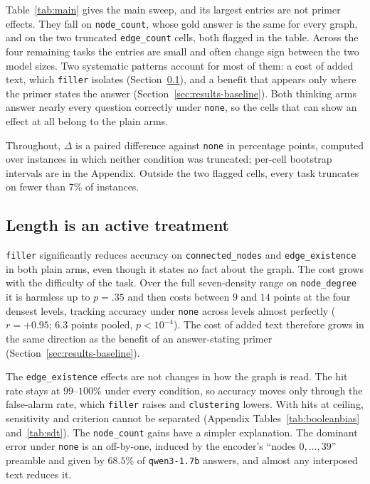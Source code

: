 \documentclass[11pt]{article}
\begin{document}


Table~\ref{tab:main} gives the main sweep, and its largest entries are not
primer effects. They fall on \texttt{node\_count}, whose gold answer is the
same for every graph, and on the two truncated \texttt{edge\_count} cells,
both flagged in the table. Across the four remaining tasks the entries are
small and often change sign between the two model sizes. Two systematic
patterns account for most of them: a cost of added text, which
\texttt{filler} isolates (Section~\ref{sec:results-length}), and a benefit
that appears only where the primer states the answer
(Section~\ref{sec:results-baseline}). Both thinking arms answer nearly
every question correctly under \texttt{none}, so the cells that can show an
effect at all belong to the plain arms.

Throughout, $\Delta$ is a paired difference against \texttt{none} in
percentage points, computed over instances in which neither condition was
truncated; per-cell bootstrap intervals are in the Appendix. Outside the
two flagged cells, every task truncates on fewer than $7\%$ of instances.

\subsection{Length is an active treatment}
\label{sec:results-length}

\texttt{filler} significantly reduces accuracy on
\texttt{connected\_nodes} and \texttt{edge\_existence} in both plain arms,
even though it states no fact about the graph. The cost grows with the
difficulty of the task. Over the full seven-density range on
\texttt{node\_degree} it is harmless up to $p{=}.35$ and then costs between
$9$ and $14$ points at the four densest levels, tracking accuracy under
\texttt{none} across levels almost perfectly ($r{=}{+}0.95$; $6.3$ points
pooled, $p{<}10^{-4}$). The cost of added text therefore grows in the same
direction as the benefit of an answer-stating primer
(Section~\ref{sec:results-baseline}).

The \texttt{edge\_existence} effects are not changes in how the graph is
read. The hit rate stays at $99$--$100\%$ under every condition, so
accuracy moves only through the false-alarm rate, which \texttt{filler}
raises and \texttt{clustering} lowers. With hits at ceiling, sensitivity
and criterion cannot be separated
\citep{macmillan2005detection,hautus1995corrections} (Appendix
Tables~\ref{tab:booleanbias} and~\ref{tab:sdt}). The \texttt{node\_count}
gains have a simpler explanation. The dominant error under \texttt{none} is
an off-by-one, induced by the encoder's ``nodes $0,\dots,39$'' preamble and
given by $68.5\%$ of \texttt{qwen3-1.7b} answers, and almost any interposed
text reduces it.
\end{document}
